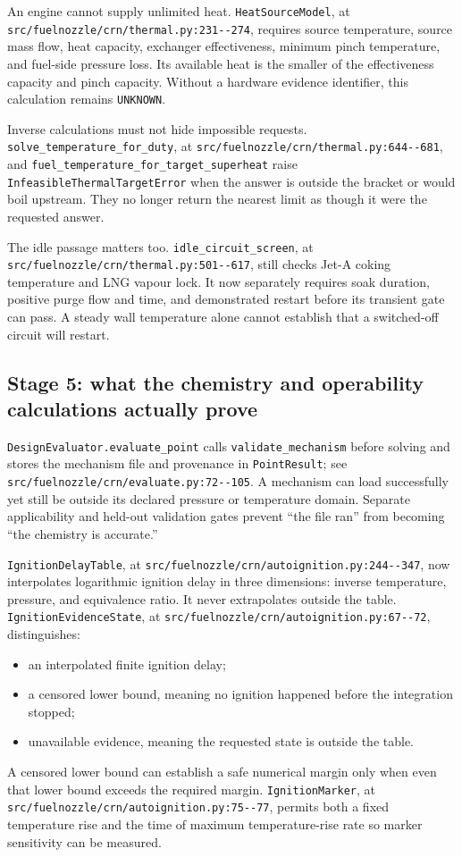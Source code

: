 \documentclass[11pt]{article}
\newcommand{\code}[1]{\nolinkurl{#1}}
\newcommand{\srcline}[2]{\nolinkurl{#1:#2}}
\begin{document}
An engine cannot supply unlimited heat. \code{HeatSourceModel}, at
\srcline{src/fuelnozzle/crn/thermal.py}{231--274}, requires source temperature, source mass
flow, heat capacity, exchanger effectiveness, minimum pinch temperature, and fuel-side
pressure loss. Its available heat is the smaller of the effectiveness capacity and pinch
capacity. Without a hardware evidence identifier, this calculation remains \code{UNKNOWN}.

Inverse calculations must not hide impossible requests. \code{solve_temperature_for_duty}, at
\srcline{src/fuelnozzle/crn/thermal.py}{644--681}, and
\code{fuel_temperature_for_target_superheat} raise
\code{InfeasibleThermalTargetError} when the answer is outside the bracket or would boil
upstream. They no longer return the nearest limit as though it were the requested answer.

The idle passage matters too. \code{idle_circuit_screen}, at
\srcline{src/fuelnozzle/crn/thermal.py}{501--617}, still checks Jet-A coking temperature and LNG
vapour lock. It now separately requires soak duration, positive purge flow and time, and
demonstrated restart before its transient gate can pass. A steady wall temperature alone
cannot establish that a switched-off circuit will restart.

\subsection{Stage 5: what the chemistry and operability calculations actually prove}

\code{DesignEvaluator.evaluate_point} calls \code{validate_mechanism} before solving and stores
the mechanism file and provenance in \code{PointResult}; see
\srcline{src/fuelnozzle/crn/evaluate.py}{72--105}. A mechanism can load successfully yet still
be outside its declared pressure or temperature domain. Separate applicability and held-out
validation gates prevent ``the file ran'' from becoming ``the chemistry is accurate.''

\code{IgnitionDelayTable}, at
\srcline{src/fuelnozzle/crn/autoignition.py}{244--347}, now interpolates logarithmic ignition
delay in three dimensions: inverse temperature, pressure, and equivalence ratio. It never
extrapolates outside the table. \code{IgnitionEvidenceState}, at
\srcline{src/fuelnozzle/crn/autoignition.py}{67--72}, distinguishes:
\begin{itemize}
  \item an interpolated finite ignition delay;
  \item a censored lower bound, meaning no ignition happened before the integration stopped;
  \item unavailable evidence, meaning the requested state is outside the table.
\end{itemize}
A censored lower bound can establish a safe numerical margin only when even that lower bound
exceeds the required margin. \code{IgnitionMarker}, at
\srcline{src/fuelnozzle/crn/autoignition.py}{75--77}, permits both a fixed temperature rise and
the time of maximum temperature-rise rate so marker sensitivity can be measured.
\end{document}
